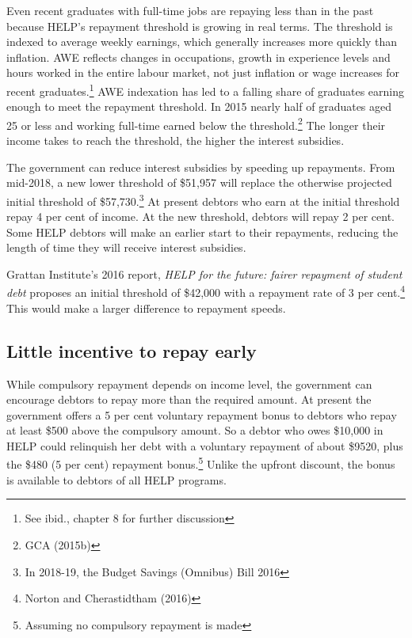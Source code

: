 \documentclass[]{book}
\begin{document}
Even recent graduates with full-time jobs are repaying less than in the past because HELP's repayment threshold is growing in real terms. The threshold is indexed to average weekly earnings, which generally increases more quickly than inflation. AWE reflects changes in occupations, growth in experience levels and hours worked in the entire labour market, not just inflation or wage increases for recent graduates.\footnote{See ibid., chapter 8 for further discussion} AWE indexation has led to a falling share of graduates earning enough to meet the repayment threshold. In 2015 nearly half of graduates aged 25 or less and working full-time earned below the threshold.\footnote{GCA (2015b)} The longer their income takes to reach the threshold, the higher the interest subsidies.

The government can reduce interest subsidies by speeding up repayments. From mid-2018, a new lower threshold of \$51,957 will replace the otherwise projected initial threshold of \$57,730.\footnote{In 2018-19, the Budget Savings (Omnibus) Bill 2016} At present debtors who earn at the initial threshold repay 4 per cent of income. At the new threshold, debtors will repay 2 per cent. Some HELP debtors will make an earlier start to their repayments, reducing the length of time they will receive interest subsidies.

Grattan Institute's 2016 report, \emph{HELP for the future: fairer repayment of student debt} proposes an initial threshold of \$42,000 with a repayment rate of 3 per cent.\footnote{Norton and Cherastidtham (2016)} This would make a larger difference to repayment speeds.

\subsection{Little incentive to repay early}\label{little-incentive-to-repay-early}

While compulsory repayment depends on income level, the government can encourage debtors to repay more than the required amount. At present the government offers a 5 per cent voluntary repayment bonus to debtors who repay at least \$500 above the compulsory amount. So a debtor who owes \$10,000 in HELP could relinquish her debt with a voluntary repayment of about \$9520, plus the \$480 (5 per cent) repayment bonus.\footnote{Assuming no compulsory repayment is made} Unlike the upfront discount, the bonus is available to debtors of all HELP programs.
\end{document}
